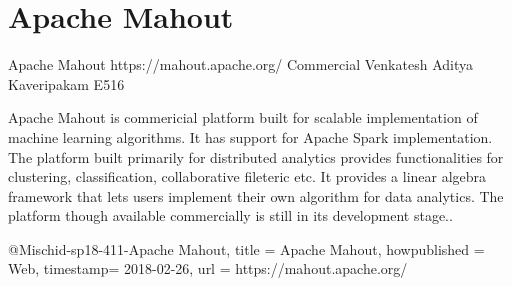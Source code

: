 \section{Apache Mahout}

Apache Mahout
https://mahout.apache.org/
Commercial
Venkatesh Aditya Kaveripakam
E516

Apache Mahout is commericial platform built for scalable implementation of
machine learning algorithms. It has support for Apache Spark implementation.
The platform built primarily for distributed analytics provides
functionalities for clustering, classification, collaborative fileteric etc.
It provides a linear algebra framework that lets users implement their own
algorithm for data analytics. The platform though available commercially is
still in its development stage.\cite{hid-sp18-411-Apache Mahout}.

@Misc{hid-sp18-411-Apache Mahout,
title = {Apache Mahout},
howpublished = {Web},
timestamp= {2018-02-26},
url = {https://mahout.apache.org/}
}